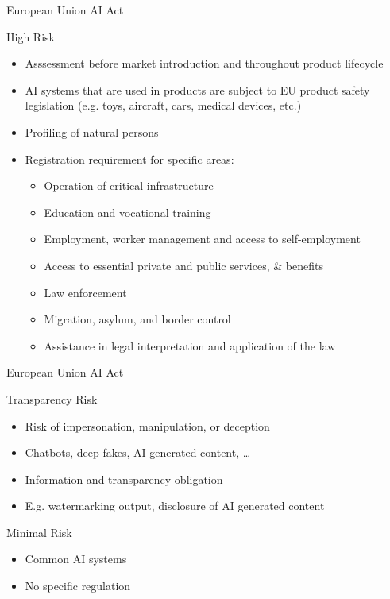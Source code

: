 \documentclass[ignorenonframetext,xcolor=x11names]{beamer}
\begin{document}
\begin{frame}{European Union AI Act}
\begin{block}{High Risk}
\begin{itemize}
   \item Asssessment before market introduction and throughout product lifecycle
   \item AI systems that are used in products are subject to EU product safety legislation (e.g. toys, aircraft, cars, medical devices, etc.)
   \item Profiling of natural persons
   \item Registration requirement for specific areas:
	\begin{itemize}
	  \item Operation of critical infrastructure
	  \item Education and vocational training
	  \item Employment, worker management and access to self-employment
	  \item Access to essential private and public services, \& benefits
	  \item Law enforcement
	  \item Migration, asylum, and border control
	  \item Assistance in legal interpretation and application of the law
    \end{itemize}
\end{itemize}
\end{block}
\end{frame}

\begin{frame}{European Union AI Act}
\begin{block}{Transparency Risk}
\begin{itemize}
   \item Risk of impersonation, manipulation, or deception
   \item Chatbots, deep fakes, AI-generated content, \ldots
   \item Information and transparency obligation
   \item E.g. watermarking output, disclosure of AI generated content
\end{itemize}
\end{block}

\begin{block}{Minimal Risk}
\begin{itemize}
   \item Common AI systems
   \item No specific regulation
\end{itemize}
\end{block}
\end{frame}
\end{document}
